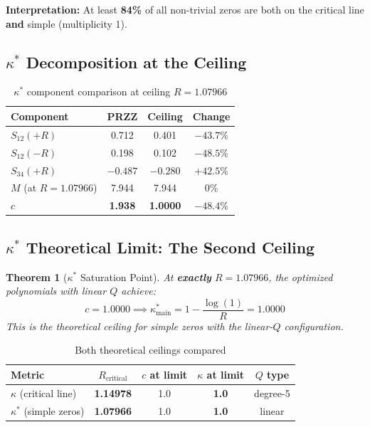 \documentclass[11pt]{article}
\newtheorem{theorem}{Theorem}
\begin{document}
\textbf{Interpretation:} At least \textbf{84\%} of all non-trivial zeros are both on the critical line \textbf{and} simple (multiplicity 1).

\subsection{$\kappa^*$ Decomposition at the Ceiling}

\begin{table}[h]
\centering
\caption{$\kappa^*$ component comparison at ceiling $R = 1.07966$}
\begin{tabular}{lccc}
\toprule
Component & PRZZ & \textbf{Ceiling} & Change \\
\midrule
$S_{12}(+R)$ & 0.712 & 0.401 & $-43.7\%$ \\
$S_{12}(-R)$ & 0.198 & 0.102 & $-48.5\%$ \\
$S_{34}(+R)$ & $-0.487$ & $-0.280$ & $+42.5\%$ \\
$M$ (at $R=1.07966$) & 7.944 & 7.944 & 0\% \\
\midrule
\textbf{$c$} & \textbf{1.938} & \textbf{1.0000} & \textbf{$-48.4\%$} \\
\bottomrule
\end{tabular}
\end{table}

\subsection{$\kappa^*$ Theoretical Limit: The Second Ceiling}

\begin{theorem}[$\kappa^*$ Saturation Point]
At \textbf{exactly} $R = 1.07966$, the optimized polynomials with linear $Q$ achieve:
\begin{equation}
\boxed{c = 1.0000 \implies \kappa^*_{\text{main}} = 1 - \frac{\log(1)}{R} = 1.0000}
\end{equation}
This is the theoretical ceiling for simple zeros with the linear-$Q$ configuration.
\end{theorem}

\begin{table}[h]
\centering
\caption{Both theoretical ceilings compared}
\begin{tabular}{lcccc}
\toprule
Metric & $R_{\text{critical}}$ & $c$ at limit & $\kappa$ at limit & $Q$ type \\
\midrule
$\kappa$ (critical line) & \textbf{1.14978} & 1.0 & \textbf{1.0} & degree-5 \\
$\kappa^*$ (simple zeros) & \textbf{1.07966} & 1.0 & \textbf{1.0} & linear \\
\bottomrule
\end{tabular}
\end{table}
\end{document}
